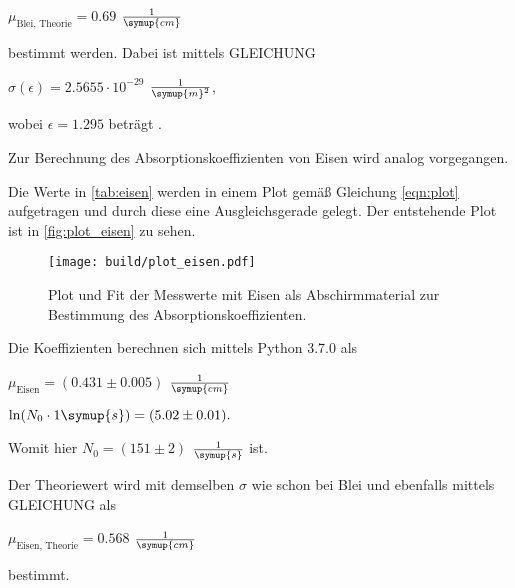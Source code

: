 \begin{center}
    $\mu_\text{Blei, Theorie} = 0.69$ $\frac{1}{\symup{cm}}$
\end{center}

bestimmt werden.
Dabei ist mittels GLEICHUNG

\begin{center}
    $\sigma (\epsilon ) = 2.5655 \cdot 10^{-29}$ $\frac{1}{\symup{m}^2}$,
\end{center}

wobei $\epsilon = 1.295$ beträgt \cite{V704}.

Zur Berechnung des Absorptionskoeffizienten von Eisen wird analog vorgegangen.



Die Werte in \autoref{tab:eisen} werden in einem Plot gemäß Gleichung \eqref{eqn:plot} aufgetragen und durch diese eine Ausgleichsgerade gelegt.
Der entstehende Plot ist in \autoref{fig:plot_eisen} zu sehen.

\begin{figure}
    \centering
    \texttt{[image: build/plot\_eisen.pdf]}
    \caption{Plot und Fit der Messwerte mit Eisen als Abschirmmaterial zur Bestimmung des Absorptionskoeffizienten.}
    \label{fig:plot_eisen}
\end{figure}

Die Koeffizienten berechnen sich mittels Python 3.7.0 als

\begin{center}
    $\mu_\text{Eisen} = (0.431 \pm 0.005)$ $\frac{1}{\symup{cm}}$

    $\ln ( N_ 0 \cdot 1 \symup{s}) = (5.02  \pm 0.01).$
\end{center}

Womit hier $N_0 = (151 \pm 2)$ $\frac{1}{\symup{s}}$ ist.

Der Theoriewert wird mit demselben $\sigma$ wie schon bei Blei und ebenfalls mittels GLEICHUNG als

\begin{center}
    $\mu_\text{Eisen, Theorie} = 0.568$ $\frac{1}{\symup{cm}}$
\end{center}

bestimmt.